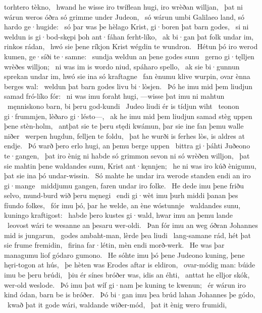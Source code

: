 torhtero tèkno, \hld\ hwand he wisse iro twíflean hugi,
iro wrèðan willjan, \hld\ þat ni wárun weros óðra
só grimme under Judeon, \hld\ só wárun umbi Galilaeo land,
só hardo ge·hugide: \hld\ só þar was þe hèlago Krist,
gi·boren þat barn godes, \hld\ si ni weldun is gi·bod-skępi þoh
ant·fáhan ferht-líko, \hld\ ak bi·gan þat folk undar im,
rinkos rádan, \hld\ hwó sie þene ríkjon Krist
wégdin te wundron. \hld\ Hétun þó iro werod kumen,
ge·síði te·samne: \hld\ sundja weldun
an þene godes sunu \hld\ gerno gi·tęlljen
wrèðes willjon; \hld\ ni was im is wordo niud,
spáharo spello, \hld\ ak sie bi·gunnun sprekan undar im,
hwó sie ina só kraftagne \hld\ fan ènumu klive wurpin,
ovar ènna berges wal: \hld\ weldun þat barn godes
livu bi·lòsjen. \hld\ Þó he imu mid þem liudjun samad
fró-líko fór: \hld\ ni was imu foraht hugi,
—wisse þat imu ni mahtun \hld\ męnniskono barn,
bi þeru god-kundi \hld\ Judeo liudi
ér is tídjun wiht \hld\ teonon gi·frummjen,
lèðaro gi·lésto—, \hld\ ak he imu mid þem liudjun samad
stèg uppen þene stèn-holm, \hld\ antþat sie te þeru stędi kwámun,
þar sie ine fan þemu walle niðer \hld\ werpen hugdun,
felljen te foldu, \hld\ þat he wurði is ferhes lòs,
is aldres at endje. \hld\ Þó warð þero erlo hugi,
an þemu berge uppen \hld\ bittra gi·þáhti
Juðeono te·gangen, \hld\ þat iro ènig ni habde só grimmon sevon
ni só wrèðen willjon, \hld\ þat sie mahtin þene waldandes sunu,
Krist ant·kęnnjen; \hld\ he ni was iro kúð ènigumu,
þat sie ina þó undar-wissin. \hld\ Só mahte he undar ira werode standen
endi an iro gi·mange \hld\ middjumu gangen,
faren undar iro folke. \hld\ He dede imu þene friðu selvo,
mund-burd wið þeru męnegi \hld\ endi gi·wèt imu þurh middi þanan
þes fíundo folkes, \hld\ fór imu þó, þar he welde,
an ène wóstunnje \hld\ waldandes sunu,
kuningo kraftigost: \hld\ habde þero kustes gi·wald,
hwar imu an þemu lande \hld\ leovost wári
te wesanne an þesaru wer-oldi. \hld\ Þan fór imu an weg óðran
Johannes mid is jungarun, \hld\ godes ambaht-man,
lèrde þea liudi \hld\ lang-samane rád,
hét þat sie frume fremidin, \hld\ firina far·létin,
mèn endi morð-werk. \hld\ He was þar managumu liof
gódaro gumono. \hld\ He sóhte imu þó þene Judeono kuning,
þene hęri-togon at hús, \hld\ þe hèten was
Erodes aftar is eldiron, \hld\ ovar-módig man:
búide imu be þeru brúdi, \hld\ þiu ér sínes bróðer was,
idis an éhti, \hld\ anttat he elljor skók,
wer-old weslode. \hld\ Þó imu þat wíf gi·nam
þe kuning te kwenun; \hld\ ér wárun iro kind ódan,
barn be is bróðer. \hld\ Þó bi·gan imu þea brúd lahan
Johannes þe gódo, \hld\ kwað þat it gode wári,
waldande wiðer-mód, \hld\ þat it ènig wero frumidi,

